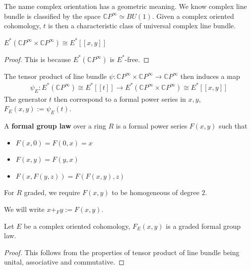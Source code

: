 The name complex orientation has a geometric meaning. We know complex line bundle is classified by the space $\mathbb{C}P^\infty\simeq BU(1)$. Given a complex oriented cohomology, $t$ is then a characteristic class of universal complex line bundle.

\begin{lemma}
    $E^*(\mathbb{C}P^∞\times \mathbb{C}P^∞)\cong E^*[[x,y]]$
\end{lemma}
\begin{proof}
    This is because $E^*(\mathbb{C}P^∞)$ is $E^*$-free.
\end{proof}
The tensor product of line bundle $\psi:\mathbb{C}P^∞\times \mathbb{C}P^∞\to \mathbb{C}P^∞$ then induces a map 
\begin{align*}
    \psi_E:E^*(\mathbb{C}P^∞)\cong E^*[[t]]\to  E^*(\mathbb{C}P^∞\times \mathbb{C}P^∞)\cong E^*[[x,y]]
\end{align*}
The generator $t$ then correspond to a formal power series in $x,y$, $F_E(x,y):=\psi_E(t)$.

\begin{definition}
    A \textbf{formal group law} over a ring $R$ is a formal power series $F(x,y)$ such that 
    \begin{itemize}
        \item $F(x,0)=F(0,x)=x$
        \item $F(x,y)=F(y,x)$
        \item $F(x,F(y,z))=F(F(x,y),z)$
    \end{itemize}
For $R$ graded, we require $F(x,y)$ to be homogeneous of degree $2$.
\end{definition}
We will write $x+_Fy:=F(x,y)$.

\begin{lemma}
    \cite{PreRudyak} Let $E$ be a complex oriented cohomology, $F_E(x,y)$ is a graded formal group law.
\end{lemma}
\begin{proof}
   This follows from the properties of tensor product of line bundle being unital, associative and commutative. 
\end{proof}

